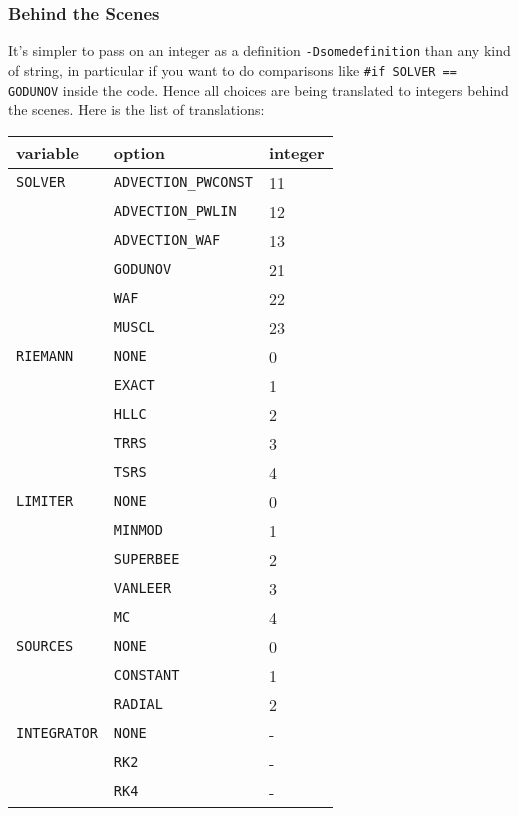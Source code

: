 \subsubsection{Behind the Scenes}


It's simpler to pass on an integer as a definition \texttt{-Dsomedefinition} than any kind of string, in particular if you want to do comparisons like \verb|#if SOLVER == GODUNOV| inside the code.
Hence all choices are being translated to integers behind the scenes.
Here is the list of translations:




\begin{center}
\begin{tabular}{l l l}

\textbf{variable}		&	\textbf{option}				&	\textbf{integer} \\
\hline
\texttt{SOLVER}			&	\texttt{ADVECTION_PWCONST}	&	11 \\
						&	\texttt{ADVECTION_PWLIN}	&	12 \\
						&	\texttt{ADVECTION_WAF}		&	13 \\
						&	\texttt{GODUNOV}			&	21 \\
						&	\texttt{WAF}				&	22 \\
						&	\texttt{MUSCL}				&	23 \\
\hline

\texttt{RIEMANN}		&	\texttt{NONE}				&	0 \\
						&	\texttt{EXACT}				&	1 \\
						&	\texttt{HLLC}				&	2 \\
						&	\texttt{TRRS}				&	3 \\
						&	\texttt{TSRS}				&	4 \\

\hline

\texttt{LIMITER}		&	\texttt{NONE}				&	0 \\
						&	\texttt{MINMOD}				&	1 \\
						&	\texttt{SUPERBEE}			&	2 \\
						&	\texttt{VANLEER}			&	3 \\
						&	\texttt{MC}					&	4 \\
\hline


\texttt{SOURCES}		&	\texttt{NONE}				&	0 \\
						&	\texttt{CONSTANT}			&	1 \\
						&	\texttt{RADIAL}				&	2 \\
\hline

\texttt{INTEGRATOR}		&	\texttt{NONE}				&	- \\
						&	\texttt{RK2}				&	- \\
						&	\texttt{RK4}				&	- \\
\hline

\end{tabular}
\end{center}



